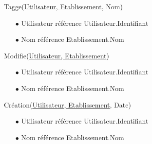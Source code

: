 \documentclass[a4paper, 11pt]{article}
\begin{document}
Tagge(\underline{Utilisateur, Etablissement}, Nom)
\begin{itemize}
	\item[$\bullet$] Utilisateur référence Utilisateur.Identifiant
	\item[$\bullet$] Nom référence Etablissement.Nom
\end{itemize}
Modifie(\underline{Utilisateur, Etablissement})
\begin{itemize}
	\item[$\bullet$] Utilisateur référence Utilisateur.Identifiant
	\item[$\bullet$] Nom référence Etablissement.Nom
\end{itemize}
Création(\underline{Utilisateur, Etablissement}, Date)
\begin{itemize}
	\item[$\bullet$] Utilisateur référence Utilisateur.Identifiant
	\item[$\bullet$] Nom référence Etablissement.Nom
\end{itemize}
\end{document}
